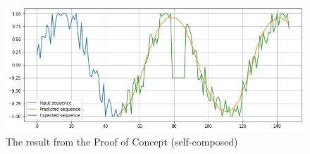 \begin{figure}[H]
    \includegraphics[width=14cm]{assets/requirement-specification/poc-autoencoder.png}
    \caption{The result from the Proof of Concept (self-composed)}
    \label{fig:poc-autoencoder}
\end{figure}

